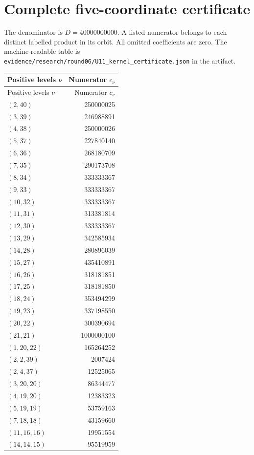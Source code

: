 \documentclass[11pt,a4paper]{article}
\begin{document}
\section{Complete five-coordinate certificate}\label{app:kernel}
The denominator is $D=40000000000$. A listed numerator belongs to each distinct labelled product in its orbit. All omitted coefficients are zero. The machine-readable table is \nolinkurl{evidence/research/round06/U11_kernel_certificate.json} in the artifact.
\begin{longtable}{@{}lr@{}}\toprule Positive levels $\nu$ & Numerator $c_\nu$\\\midrule\endfirsthead
\toprule Positive levels $\nu$ & Numerator $c_\nu$\\\midrule\endhead
$(2,40)$ & 250000025\\
$(3,39)$ & 246988891\\
$(4,38)$ & 250000026\\
$(5,37)$ & 227840140\\
$(6,36)$ & 268180709\\
$(7,35)$ & 290173708\\
$(8,34)$ & 333333367\\
$(9,33)$ & 333333367\\
$(10,32)$ & 333333367\\
$(11,31)$ & 313381814\\
$(12,30)$ & 333333367\\
$(13,29)$ & 342585934\\
$(14,28)$ & 280896039\\
$(15,27)$ & 435410891\\
$(16,26)$ & 318181851\\
$(17,25)$ & 318181850\\
$(18,24)$ & 353494299\\
$(19,23)$ & 337198550\\
$(20,22)$ & 300390694\\
$(21,21)$ & 1000000100\\
$(1,20,22)$ & 165264252\\
$(2,2,39)$ & 2007424\\
$(2,4,37)$ & 12525065\\
$(3,20,20)$ & 86344477\\
$(4,19,20)$ & 12383323\\
$(5,19,19)$ & 53759163\\
$(7,18,18)$ & 43159660\\
$(11,16,16)$ & 19951554\\
$(14,14,15)$ & 95519959\\

\end{longtable}
\end{document}
